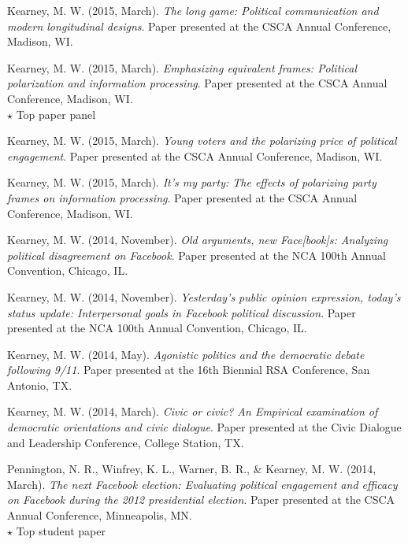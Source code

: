 \documentclass[11pt,letterpaper]{article}
\begin{document}
\begin{bibenum}
\item[] Kearney, M. W. (2015, March).
  \emph{The long game: Political communication and modern longitudinal
    designs}.
  Paper presented at the CSCA Annual Conference, Madison, WI.

\item[] Kearney, M. W. (2015, March).
  \emph{Emphasizing equivalent frames: Political polarization and
    information processing}. Paper presented at the CSCA Annual
  Conference, Madison, WI.\\
  {$\star$} Top paper panel

\item[] Kearney, M. W. (2015, March).
  \emph{Young voters and the polarizing price of political engagement}.
  Paper presented at the CSCA Annual Conference, Madison, WI.

\item[] Kearney, M. W. (2015, March).
  \emph{It's my party: The effects of polarizing party frames on
    information processing}.
  Paper presented at the CSCA Annual Conference, Madison, WI.

\item[] Kearney, M. W. (2014, November).
  \emph{Old arguments, new Face[book]s: Analyzing political
    disagreement on Facebook}.
  Paper presented at the NCA 100th Annual Convention, Chicago, IL.

\item[] Kearney, M. W. (2014, November).
  \emph{Yesterday's public opinion expression, today's status update:
    Interpersonal goals in Facebook political discussion}.
  Paper presented at the NCA 100th Annual Convention, Chicago, IL.

\item[] Kearney, M. W. (2014, May).
  \emph{Agonistic politics and the democratic debate following 9/11}.
  Paper presented at the 16th Biennial RSA Conference, San Antonio,
  TX.

\item[] Kearney, M. W. (2014, March).
  \emph{Civic or civic? An Empirical examination of democratic
    orientations and civic dialogue}.
  Paper presented at the Civic Dialogue and Leadership Conference,
  College Station, TX.

\item[] Pennington, N. R., Winfrey, K. L., Warner, B. R., \& Kearney,
  M. W. (2014, March).
  \emph{The next Facebook election: Evaluating political engagement and
    efficacy on Facebook during the 2012 presidential election}.
  Paper presented at the CSCA Annual Conference, Minneapolis, MN.\\
  {$\star$} Top student paper


\end{bibenum}
\end{document}
